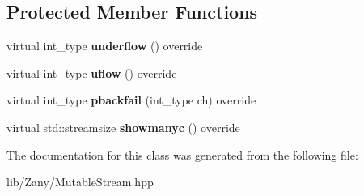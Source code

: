 \subsection*{Protected Member Functions}
\begin{DoxyCompactItemize}
\item 
\mbox{\label{classzany_1_1_network_stream_buf_ac180df192b1149bad0a6610f7fcfb474}} 
virtual int\+\_\+type {\bfseries underflow} () override
\item 
\mbox{\label{classzany_1_1_network_stream_buf_ad43ce1322efa1b5c582509f407aea818}} 
virtual int\+\_\+type {\bfseries uflow} () override
\item 
\mbox{\label{classzany_1_1_network_stream_buf_a670fe944f7068e35d5830999a681a3fc}} 
virtual int\+\_\+type {\bfseries pbackfail} (int\+\_\+type ch) override
\item 
\mbox{\label{classzany_1_1_network_stream_buf_a09a2bd33fbc96bf52030864c0b1eae30}} 
virtual std\+::streamsize {\bfseries showmanyc} () override
\end{DoxyCompactItemize}


The documentation for this class was generated from the following file\+:\begin{DoxyCompactItemize}
\item 
lib/\+Zany/Mutable\+Stream.\+hpp\end{DoxyCompactItemize}
